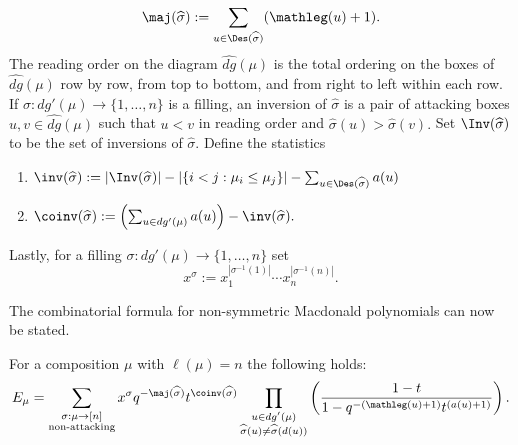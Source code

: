 \begin{defi}
$$\maj(\widehat{\sigma}):= \sum_{u \in \Des(\widehat{\sigma})} (\mathleg(u)+1).$$
The reading order on the diagram $\widehat{dg}(\mu)$ is the total ordering on the boxes of $\widehat{dg}(\mu)$ row by row, from top to bottom, and from right to left within each row. If $\sigma: dg'(\mu) \rightarrow \{1,\ldots,n\}$ is a filling, an inversion of $\widehat{\sigma}$ is a pair of attacking boxes $u,v \in \widehat{dg}(\mu)$ such that $u < v$ in reading order and $\widehat{\sigma}(u) > \widehat{\sigma}(v).$ Set $\Inv(\widehat{\sigma})$ to be the set of inversions of $\widehat{\sigma}$. Define the statistics 
\begin{enumerate}
    \item $\inv(\widehat{\sigma}):= |\Inv(\widehat{\sigma})| -|\{i<j: \mu_i \leq \mu_j\}| - \sum_{u \in \Des(\widehat{\sigma})} a(u)$
    \item $\coinv(\widehat{\sigma}):= \left( \sum_{u \in dg'(\mu)} a(u) \right) -\inv(\widehat{\sigma}).$
    \end{enumerate}
Lastly, for a filling $\sigma:dg'(\mu) \rightarrow \{1,\ldots,n\}$ set $$x^{\sigma}:= x_1^{|\sigma^{-1}(1)|}\cdots x_n^{|\sigma^{-1}(n)|}.$$
\end{defi}

The combinatorial formula for non-symmetric Macdonald polynomials can now be stated.

\begin{thm} \label{HHL}
For a composition $\mu$ with $\ell(\mu) = n$ the following holds:
    $$E_{\mu} = \sum_{\substack{\sigma: \mu \rightarrow [n]\\ \text{non-attacking}}} x^{\sigma}q^{-\maj(\widehat{\sigma})}t^{\coinv(\widehat{\sigma})} \prod_{\substack{u \in dg'(\mu) \\ \widehat{\sigma}(u) \neq \widehat{\sigma}(d(u))}} \left( \frac{1-t}{1-q^{-(\mathleg(u)+1)}t^{(a(u)+1)}} \right). $$
\end{thm}

